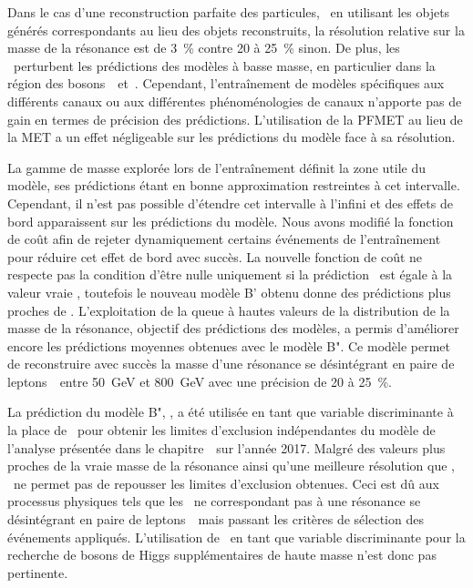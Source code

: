 Dans le cas d'une reconstruction parfaite des particules,
\ie\ en utilisant les objets générés correspondants au lieu des objets reconstruits,
la résolution relative sur la masse de la résonance est de \SI{3}{\%}
contre \num{20} à \SI{25}{\%} sinon.
De plus, les \ftauhs\ perturbent les prédictions des modèles à basse masse,
en particulier dans la région des bosons~\Zboson\ et~\higgs.
Cependant, l'entraînement de modèles spécifiques aux différents canaux ou aux différentes phénoménologies de canaux n'apporte pas de gain en termes de précision des prédictions.
L'utilisation de la PFMET au lieu de la \PUPPI MET a un effet négligeable sur les prédictions du modèle face à sa résolution.
\par
La gamme de masse explorée lors de l'entraînement définit la zone utile du modèle, ses prédictions étant en bonne approximation restreintes à cet intervalle.
Cependant, il n'est pas possible d'étendre cet intervalle à l'infini
et des effets de bord apparaissent sur les prédictions du modèle.
Nous avons modifié la fonction de coût afin de rejeter dynamiquement certains événements de l'entraînement pour réduire cet effet de bord avec succès.
La nouvelle fonction de coût ne respecte pas la condition d'être nulle uniquement si la prédiction \ypred\ est égale à la valeur vraie \ytrue,
toutefois le nouveau modèle B' obtenu donne des prédictions plus proches de \ytrue.
L'exploitation de la queue à hautes valeurs de la distribution de la masse de la résonance, objectif des prédictions des modèles,
a permis d'améliorer encore les prédictions moyennes obtenues avec le modèle B".
Ce modèle permet de reconstruire avec succès la masse d'une résonance se désintégrant en paire de leptons~\tau\
entre \SI{50}{\GeV} et \SI{800}{\GeV} avec une précision de \num{20} à \SI{25}{\%}.
\par
La prédiction du modèle B", \mml, a été utilisée en tant que variable discriminante à la place de \mTtot\ pour obtenir les limites d'exclusion indépendantes du modèle de l'analyse présentée dans le chapitre~\ sur l'année 2017.
Malgré des valeurs plus proches de la vraie masse de la résonance
ainsi qu'une meilleure résolution que \mTtot, \mml\
ne permet pas de repousser les limites d'exclusion obtenues.
Ceci est dû aux processus physiques tels que les \ftauhs\ ne correspondant pas à une résonance se désintégrant en paire de leptons~\tau\
mais passant les critères de sélection des événements appliqués.
L'utilisation de \mml\ en tant que variable discriminante pour la recherche de bosons de Higgs supplémentaires de haute masse n'est donc pas pertinente.
